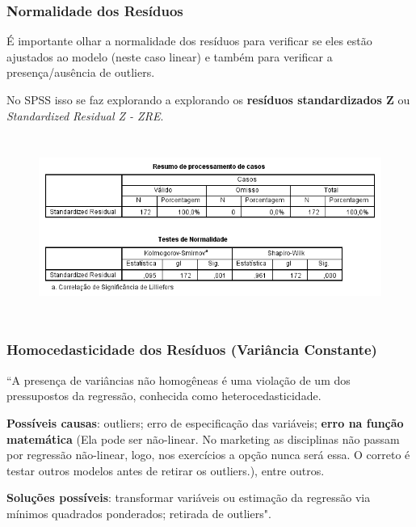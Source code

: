 		\subsubsection{Normalidade dos Resíduos}

			É importante olhar a normalidade dos resíduos para verificar se eles estão ajustados ao modelo (neste caso linear) e também para verificar a presença/ausência de outliers.
			
			No SPSS isso se faz explorando a explorando os \textbf{resíduos standardizados Z} ou \emph{Standardized Residual Z - ZRE}. \cite{torres}

			\begin{figure}[H]
				\centering
				\includegraphics[height=6cm]{images/rl_normalidade-de-residuos}
			\end{figure}

		\subsubsection{Homocedasticidade dos Resíduos (Variância Constante)}

			``A presença de variâncias não homogêneas é uma violação de um dos pressupostos da regressão, conhecida como heterocedasticidade.
			
			\bigskip
			
			\textbf{Possíveis causas}: outliers; erro de especificação das variáveis; \textbf{erro na função matemática} (Ela pode ser não-linear. No marketing as disciplinas não passam por regressão não-linear, logo, nos exercícios a opção nunca será essa. O correto é testar outros modelos antes de retirar os outliers.), entre outros.
			
			\bigskip
			
			\textbf{Soluções possíveis}: transformar variáveis ou estimação da regressão via mínimos quadrados ponderados; retirada de outliers". \cite{torres}

